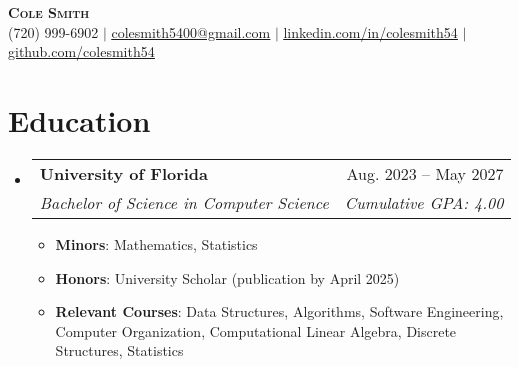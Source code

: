 \documentclass[letterpaper,12pt]{article}
\makeatletter
\newcommand{\resumeItem}[1]{
  \item\small{
    {#1 \vspace{-2pt}}
  }
}
\newcommand{\resumeSubheading}[4]{
  \vspace{-2pt}\item
    \begin{tabular*}{0.97\textwidth}[t]{l@{\extracolsep{\fill}}r}
      \textbf{#1} & #2 \\
      \textit{\small#3} & \textit{\small #4} \\
    \end{tabular*}\vspace{-7pt}
}
\newcommand{\resumeSubHeadingListStart}{\begin{itemize}[leftmargin=0.15in, label={}]}
\newcommand{\resumeSubHeadingListEnd}{\end{itemize}}
\newcommand{\resumeItemListStart}{\begin{itemize}}
\newcommand{\resumeItemListEnd}{\end{itemize}\vspace{-5pt}}
\makeatother
\begin{document}
\begin{center}
    \textbf{\Huge \scshape Cole Smith} \\ \vspace{1pt}
    \small (720) 999-6902 $|$ \href{mailto:colesmith5400@gmail.com}{\underline{colesmith5400@gmail.com}} $|$ 
    \href{https://linkedin.com/in/colesmith54}{\underline{linkedin.com/in/colesmith54}} $|$
    \href{https://github.com/colesmith54}{\underline{github.com/colesmith54}}
\end{center}


\section{Education}
  \resumeSubHeadingListStart
    \resumeSubheading
      {University of Florida}{Aug. 2023 -- May 2027}
      {Bachelor of Science in Computer Science}{Cumulative GPA: 4.00}
      \resumeItemListStart
        \resumeItem{\textbf{Minors}: Mathematics, Statistics}
        \resumeItem{\textbf{Honors}: {University Scholar (publication by April 2025)}}
        \resumeItem{\textbf{Relevant Courses}: Data Structures, Algorithms, Software Engineering, Computer Organization, Computational Linear Algebra, Discrete Structures, Statistics}
      \resumeItemListEnd
  \resumeSubHeadingListEnd
\end{document}
